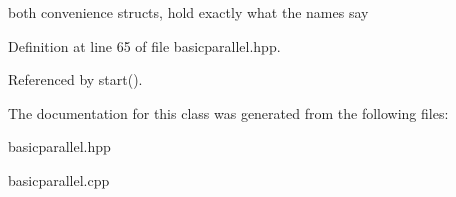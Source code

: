 both convenience structs, hold exactly what the names say 

Definition at line 65 of file basicparallel.\+hpp.



Referenced by start().



The documentation for this class was generated from the following files\+:\begin{DoxyCompactItemize}
\item 
basicparallel.\+hpp\item 
basicparallel.\+cpp\end{DoxyCompactItemize}
